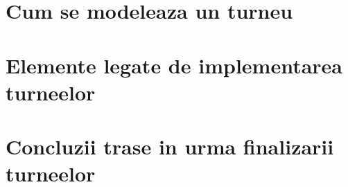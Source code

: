 \section {Cum se modeleaza un turneu}

\section {Elemente legate de implementarea turneelor}

\section {Concluzii trase in urma finalizarii turneelor}